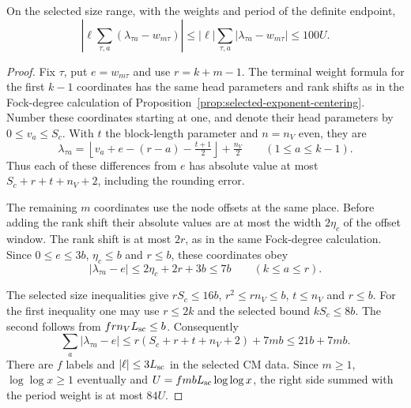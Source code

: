 \begin{auxlemma}\label{lem:terminal-centred-weights}
On the selected size range, with the weights and period of the definite endpoint,
\[
 \left|\ell\sum_{\tau,a}(\lambda_{\tau a}-w_{m\tau})\right|
     \le |\ell|\sum_{\tau,a}|\lambda_{\tau a}-w_{m\tau}|\le 100U .
\]
\end{auxlemma}
\begin{proof}
Fix \(\tau\), put \(e=w_{m\tau}\) and use \(r=k+m-1\). The terminal weight formula for the first \(k-1\) coordinates has the same head parameters and rank shifts as in the Fock-degree calculation of Proposition~\ref{prop:selected-exponent-centering}. Number these coordinates starting at one, and denote their head parameters by \(0\le v_a\le S_c\). With \(t\) the block-length parameter and \(n=n_V\) even, they are
\[
 \lambda_{\tau a}
   =\left\lfloor v_a+e-(r-a)-\tfrac{t+1}{2}\right\rfloor
            +\tfrac{n_V}{2}\qquad(1\le a\le k-1).
\]
Thus each of these differences from \(e\) has absolute value at most \(S_c+r+t+n_V+2\), including the rounding error.

The remaining \(m\) coordinates use the node offsets at the same place. Before adding the rank shift their absolute values are at most the width \(2\eta_c\) of the offset window. The rank shift is at most \(2r\), as in the same Fock-degree calculation. Since \(0\le e\le3b\), \(\eta_c\le b\) and \(r\le b\), these coordinates obey
\[
   |\lambda_{\tau a}-e|\le 2\eta_c+2r+3b\le7b
                   \qquad(k\le a\le r).
\]

The selected size inequalities give \(rS_c\le16b\), \(r^2\le rn_V\le b\), \(t\le n_V\) and \(r\le b\). For the first inequality one may use \(r\le2k\) and the selected bound \(kS_c\le 8b\). The second follows from \(frn_VL_{\rm sc}\le b\). Consequently
\[
 \sum_a|\lambda_{\tau a}-e|
     \le r(S_c+r+t+n_V+2)+7mb\le21b+7mb .
\]
There are \(f\) labels and \(|\ell|\le3L_{\rm sc}\) in the selected CM data. Since \(m\ge1\), \(\log\log x\ge1\) eventually and \(U=fmbL_{\rm sc}\log\log x\), the right side summed with the period weight is at most \(84U\).
\end{proof}

